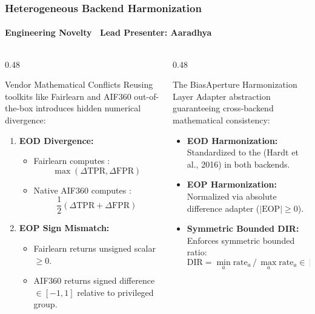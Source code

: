 \begin{frame}
  \frametitle{Heterogeneous Backend Harmonization}
  \framesubtitle{Engineering Novelty \textbar\ Lead Presenter: Aaradhya}

  \begin{columns}[T]
    \begin{column}{0.48\textwidth}
      \begin{alertcard}{Vendor Mathematical Conflicts}
        \scriptsize
        Reusing toolkits like Fairlearn and AIF360 out-of-the-box introduces hidden numerical divergence:
        \vspace{0.05cm}
        \begin{enumerate}\scriptsize
          \item \textbf{EOD Divergence:}
          \begin{itemize}\tiny
            \item Fairlearn computes :
            $$\max(\Delta\text{TPR}, \Delta\text{FPR})$$
            \item Native AIF360 computes :
            $$\frac{1}{2}(\Delta\text{TPR} + \Delta\text{FPR})$$
          \end{itemize}
          \item \textbf{EOP Sign Mismatch:}
          \begin{itemize}\tiny
            \item Fairlearn returns unsigned scalar $\ge 0$.
            \item AIF360 returns signed difference $\in [-1, 1]$ relative to privileged group.
          \end{itemize}
        \end{enumerate}
      \end{alertcard}
    \end{column}

    \begin{column}{0.48\textwidth}
      \begin{successcard}{The BiasAperture Harmonization Layer}
        \scriptsize
        Adapter abstraction guaranteeing cross-backend mathematical consistency:
        \vspace{0.05cm}
        \begin{itemize}\scriptsize
          \item \textbf{EOD Harmonization:} Standardized to the  (Hardt et al., 2016) in both backends.
          \item \textbf{EOP Harmonization:} Normalized via absolute difference adapter ($|\text{EOP}| \ge 0$).
          \item \textbf{Symmetric Bounded DIR:} Enforces symmetric bounded ratio:
          $$\text{DIR} = \min_a \text{rate}_a \,/\, \max_a \text{rate}_a \in [0, 1]$$
        \end{itemize}
      \end{successcard}


\end{column}
\end{columns}
\end{frame}
